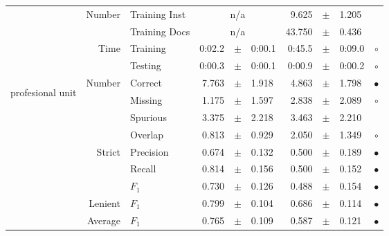 \begin{longtable}{|r|r|l||rcl|rcl|c|}
\cline{2-10} & \multirow{2}{*}{    Number} &   Training Inst &    \multicolumn{3}{c|}{n/a}         &       9.625 &  $\pm$  &       1.205 &  \\
\cline{3-10} &                             &   Training Docs &    \multicolumn{3}{c|}{n/a}         &      43.750 &  $\pm$  &       0.436 &  \\
\cline{2-10} & \multirow{2}{*}{      Time} &        Training &      0:02.2 &  $\pm$  &      0:00.1 &      0:45.5 &  $\pm$  &      0:09.0 & $\circ$ \\
\cline{3-10} &                             &         Testing &      0:00.3 &  $\pm$  &      0:00.1 &      0:00.9 &  $\pm$  &      0:00.2 & $\circ$ \\
\hline
\hline
\multirow{11}{*}{\begin{sideways}profesional unit\end{sideways} }
             & \multirow{4}{*}{    Number} &         Correct &       7.763 &  $\pm$  &       1.918 &       4.863 &  $\pm$  &       1.798 & $\bullet$ \\
\cline{3-10} &                             &         Missing &       1.175 &  $\pm$  &       1.597 &       2.838 &  $\pm$  &       2.089 & $\circ$ \\
\cline{3-10} &                             &        Spurious &       3.375 &  $\pm$  &       2.218 &       3.463 &  $\pm$  &       2.210 &  \\
\cline{3-10} &                             &         Overlap &       0.813 &  $\pm$  &       0.929 &       2.050 &  $\pm$  &       1.349 & $\circ$ \\
\cline{2-10} & \multirow{3}{*}{    Strict} &       Precision &       0.674 &  $\pm$  &       0.132 &       0.500 &  $\pm$  &       0.189 & $\bullet$ \\
\cline{3-10} &                             &          Recall &       0.814 &  $\pm$  &       0.156 &       0.500 &  $\pm$  &       0.152 & $\bullet$ \\
\cline{3-10} &                             &           $F_1$ &       0.730 &  $\pm$  &       0.126 &       0.488 &  $\pm$  &       0.154 & $\bullet$ \\
\cline{2-10} &                     Lenient &           $F_1$ &       0.799 &  $\pm$  &       0.104 &       0.686 &  $\pm$  &       0.114 & $\bullet$ \\
\cline{2-10} &                     Average &           $F_1$ &       0.765 &  $\pm$  &       0.109 &       0.587 &  $\pm$  &       0.121 & $\bullet$ \\

\end{longtable}
